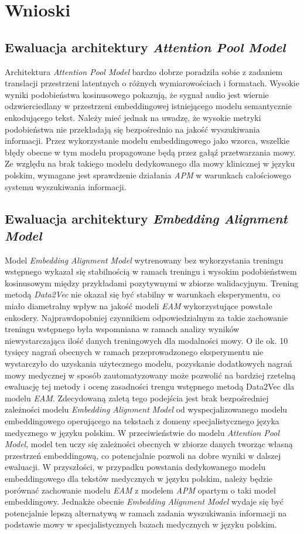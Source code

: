 \section{Wnioski}
\subsection{Ewaluacja architektury \textit{Attention Pool Model}}
Architektura \textit{Attention Pool Model} bardzo dobrze poradziła sobie z zadaniem translacji przestrzeni latentnych o różnych wymiarowościach i formatach. Wysokie wyniki podobieństwa kosinusowego pokazują, że sygnał audio jest wiernie odzwierciedlany w przestrzeni embeddingowej istniejącego modelu semantycznie enkodującego tekst. Należy mieć jednak na uwadzę, że wysokie metryki podobieństwa nie przekładają się bezpośrednio na jakość wyszukiwania informacji. Przez wykorzystanie modelu embeddingowego jako wzorca, wszelkie błędy obecne w tym modelu propagowane będą przez gałąź przetwarzania mowy. Ze względu na brak takiego modelu dedykowanego dla mowy klinicznej w języku polskim, wymagane jest sprawdzenie działania \textit{APM} w warunkach całościowego systemu wyszukiwania informacji.
\subsection{Ewaluacja architektury \textit{Embedding Alignment Model}}
Model \textit{Embedding Alignment Model} wytrenowany bez wykorzystania treningu wstępnego wykazał się stabilnością w ramach treningu i wysokim podobieństwem kosinusowym między przykładami pozytywnymi w zbiorze walidacyjnym. Trening metodą \textit{Data2Vec} nie okazał się być stabilny w warunkach eksperymentu, co miało diametralny wpływ na jakość modeli \textit{EAM} wykorzystujące powstałe enkodery. Najprawdopobniej czynnikiem odpowiedzialnym za takie zachowanie treningu wstępnego była wspomniana w ramach analizy wyników niewystarczająca ilość danych treningowych dla modalności mowy. O ile ok. 10 tysięcy nagrań obecnych w ramach przeprowadzonego eksperymentu nie wystarczyło do uzyskania użytecznego modelu, pozyskanie dodatkowych nagrań mowy medycznej w sposób zautomatyzowany może pozwolić na bardziej rzetelną ewaluację tej metody i ocenę zasadności trengu wstępnego metodą Data2Vec dla modelu \textit{EAM}.
Zdecydowaną zaletą tego podejścia jest brak bezpośredniej zależności modelu \textit{Embedding Alignment Model} od wyspecjalizowanego modelu embeddingowego operującego na tekstach z domeny specjalistycznego języka medycznego w języku polskim. W przeciwieństwie do modelu \textit{Attention Pool Model}, model ten uczy się zależności obecnych w zbiorze danych tworząc własną przestrzeń embeddingową, co potencjalnie pozwoli na dobre wyniki w dalszej ewaluacji. W przyszłości, w przypadku powstania dedykowanego modelu embeddingowego dla tekstów medycznych w języku polskim, należy będzie porównać zachowanie modelu \textit{EAM} z modelem \textit{APM} opartym o taki model embeddingowy. Jednakże obecnie \textit{Embedding Alignment Model} wydaje się być potencjalnie lepszą alternatywą w ramach zadania wyszukiwania informacji na podstawie mowy w specjalistycznych bazach medycznych w języku polskim.
